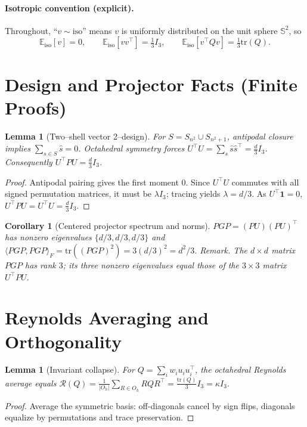 \documentclass[11pt]{article}
\newtheorem{lemma}[theorem]{Lemma}
\newtheorem{corollary}[theorem]{Corollary}
\theoremstyle{definition}
\newcommand{\E}{\mathbb{E}}
\newcommand{\Sph}{\mathbb{S}}
\newcommand{\1}{\mathbf{1}}
\newcommand{\tr}{\mathrm{tr}}
\newcommand{\oh}{O_h}
\begin{document}
\paragraph{Isotropic convention (explicit).}
Throughout, ``\(v\sim\mathrm{iso}\)'' means \(v\) is uniformly distributed on the unit sphere \(\Sph^2\), so
\[
\E_{\mathrm{iso}}[v]=0,\qquad \E_{\mathrm{iso}}[vv^\top]=\tfrac{1}{3}I_3,\qquad \E_{\mathrm{iso}}[v^\top Q v]=\tfrac{1}{3}\tr(Q).
\]

\section{Design and Projector Facts (Finite Proofs)}
\begin{lemma}[Two–shell vector 2–design]
\label{lem:design}
For \(S=S_{n^2}\cup S_{n^2+1}\), antipodal closure implies \(\sum_{s\in S}\hat s=0\). Octahedral symmetry forces
\(
U^\top U=\sum_s \hat s\hat s^\top=\frac{d}{3}I_3
\).
Consequently \(U^\top P U=\frac{d}{3}I_3\).
\end{lemma}
\begin{proof}
Antipodal pairing gives the first moment \(0\).
Since \(U^\top U\) commutes with all signed permutation matrices, it must be \(\lambda I_3\); tracing yields \(\lambda=d/3\).
As \(U^\top \1=0\), \(U^\top P U=U^\top U=\frac{d}{3}I_3\).
\end{proof}

\begin{corollary}[Centered projector spectrum and norms]
\label{cor:spec}
\(PGP=(PU)(PU)^\top\) has nonzero eigenvalues \(\{d/3,d/3,d/3\}\) and
\(
\langle PGP,PGP\rangle_F=\tr((PGP)^2)=3(d/3)^2=d^2/3.
\)
\emph{Remark.} The \(d\times d\) matrix \(PGP\) has rank \(3\); its three nonzero eigenvalues equal those of the \(3\times 3\) matrix \(U^\top P U\).
\end{corollary}

\section{Reynolds Averaging and Orthogonality}
\begin{lemma}[Invariant collapse]
\label{lem:reynolds}
For \(Q=\sum_i w_i u_i u_i^\top\), the octahedral Reynolds average equals
\(
\mathcal{R}(Q)=\frac{1}{|\oh|}\sum_{R\in \oh} RQR^\top=\frac{\tr(Q)}{3}I_3=\kappa I_3
\).
\end{lemma}
\begin{proof}
Average the symmetric basis: off-diagonals cancel by sign flips, diagonals equalize by permutations and trace preservation.
\end{proof}
\end{document}
